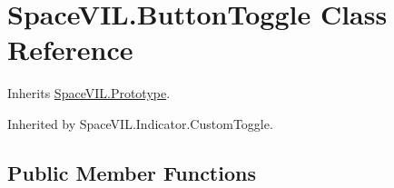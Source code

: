 \hypertarget{class_space_v_i_l_1_1_button_toggle}{}\section{Space\+V\+I\+L.\+Button\+Toggle Class Reference}
\label{class_space_v_i_l_1_1_button_toggle}


Inherits \mbox{\hyperlink{class_space_v_i_l_1_1_prototype}{Space\+V\+I\+L.\+Prototype}}.



Inherited by Space\+V\+I\+L.\+Indicator.\+Custom\+Toggle.

\subsection*{Public Member Functions}
